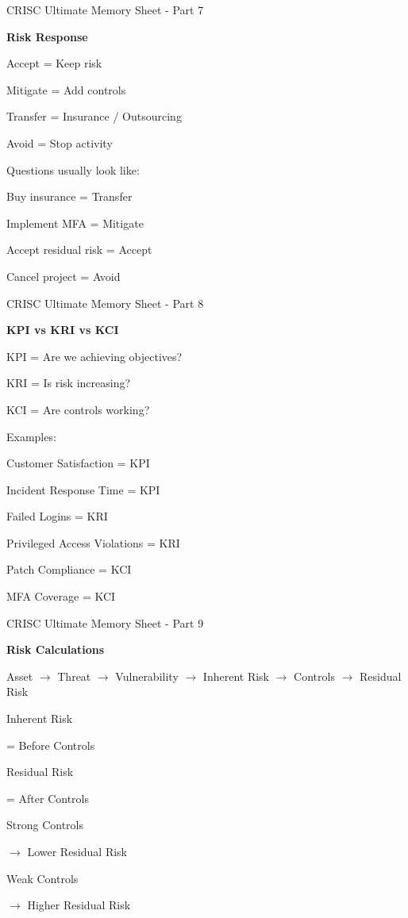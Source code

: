 \documentclass{beamer}
\begin{document}
	\begin{frame}[shrink=5]{CRISC Ultimate Memory Sheet - Part 7}
		\footnotesize
		
		\textbf{Risk Response}
		
		Accept
		= Keep risk
		
		Mitigate
		= Add controls
		
		Transfer
		= Insurance / Outsourcing
		
		Avoid
		= Stop activity
		
		\medskip
		
		Questions usually look like:
		
		Buy insurance
		= Transfer
		
		Implement MFA
		= Mitigate
		
		Accept residual risk
		= Accept
		
		Cancel project
		= Avoid
		
	\end{frame}
	
	\begin{frame}[shrink=5]{CRISC Ultimate Memory Sheet - Part 8}
		\footnotesize
		
		\textbf{KPI vs KRI vs KCI}
		
		KPI
		= Are we achieving objectives?
		
		KRI
		= Is risk increasing?
		
		KCI
		= Are controls working?
		
		\medskip
		
		Examples:
		
		Customer Satisfaction
		= KPI
		
		Incident Response Time
		= KPI
		
		Failed Logins
		= KRI
		
		Privileged Access Violations
		= KRI
		
		Patch Compliance
		= KCI
		
		MFA Coverage
		= KCI
		
	\end{frame}
	
	\begin{frame}[shrink=5]{CRISC Ultimate Memory Sheet - Part 9}
		\footnotesize
		
		\textbf{Risk Calculations}
		
		Asset
		$\rightarrow$
		Threat
		$\rightarrow$
		Vulnerability
		$\rightarrow$
		Inherent Risk
		$\rightarrow$
		Controls
		$\rightarrow$
		Residual Risk
		
		\medskip
		
		Inherent Risk
		
		= Before Controls
		
		Residual Risk
		
		= After Controls
		
		\medskip
		
		Strong Controls
		
		$\rightarrow$
		Lower Residual Risk
		
		Weak Controls
		
		$\rightarrow$
		Higher Residual Risk
		
	\end{frame}
	
\end{document}
